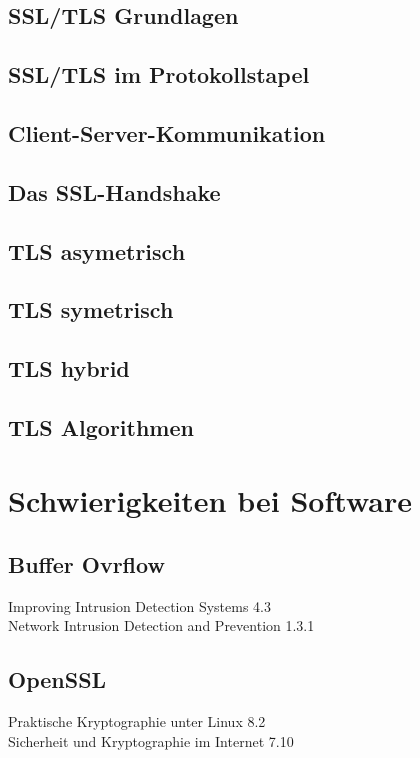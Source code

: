 \documentclass[11pt]{scrartcl}
\begin{document}
\subsection{SSL/TLS Grundlagen}
\label{sec:ssl-tls-basics}

\subsection{SSL/TLS im Protokollstapel}
\label{sec:ssl-tls-protocolstack}

\subsection{Client-Server-Kommunikation}
\label{sec:client-server-communication}


\subsection{Das SSL-Handshake}
\label{sec:ssl-handshake}

\subsection{TLS asymetrisch}
\label{sec:tls-asymetric}

\subsection{TLS symetrisch}
\label{sec:tls-symetric}

\subsection{TLS hybrid}
\label{sec:tls-hybrid}

\subsection{TLS Algorithmen}
\label{sec:tls-algorithmen}


\section{Schwierigkeiten bei Software}
\label{sec:sw-trouble}

\subsection{Buffer Ovrflow}
\label{sec:buffer-overflow}
Improving Intrusion Detection Systems 4.3\\
Network Intrusion Detection and Prevention 1.3.1

\subsection{OpenSSL}
\label{sec:openssl}
Praktische Kryptographie unter Linux 8.2\\
Sicherheit und Kryptographie im Internet 7.10

\newpage
\listoffigures
{}
\mbox{}
\nocite{*}


\end{document}
